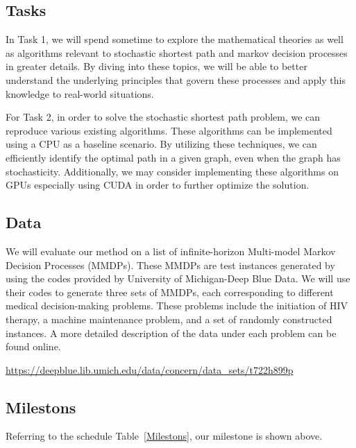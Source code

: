 \documentclass{article}
\begin{document}
\subsection{Tasks}

In Task 1, we will spend sometime to explore the mathematical theories as well as algorithms 
relevant to stochastic shortest path and markov decision processes in greater details. 
By diving into these topics, we will be able to better understand the underlying principles 
that govern these processes and apply this knowledge to real-world situations. 

For Task 2, in order to solve the stochastic shortest path problem, we can reproduce various 
existing algorithms. These algorithms can be implemented using a CPU as a baseline scenario. 
By utilizing these techniques, we can efficiently identify the optimal path in a given graph, 
even when the graph has stochasticity. Additionally, we may consider implementing these algorithms 
on GPUs especially using CUDA in order to further optimize the solution.

\subsection{Data}

We will evaluate our method on a list of infinite-horizon Multi-model Markov Decision Processes (MMDPs). 
These MMDPs are test instances generated by using the codes provided by University of Michigan-Deep Blue Data. 
We will use their codes to generate three sets of MMDPs, each corresponding to different medical decision-making problems. 
These problems include the initiation of HIV therapy, a machine maintenance problem, and a set of randomly constructed instances. 
A more detailed description of the data under each problem can be found online. 

\begin{center}
  \url{https://deepblue.lib.umich.edu/data/concern/data_sets/t722h899p}
\end{center}

\subsection{Milestons}

Referring to the schedule Table~\ref{Milestons}, our milestone is shown above.
\end{document}
